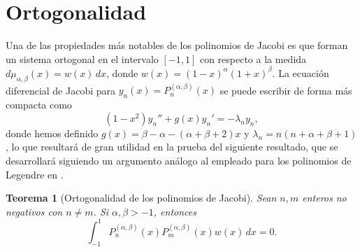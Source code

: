 \documentclass[12pt,a4paper]{book}
\newtheorem{theorem}{Teorema}
\begin{document}
\section{Ortogonalidad}

Una de las propiedades más notables de los polinomios de Jacobi es que forman un sistema ortogonal en el intervalo $[-1, 1]$ con respecto a la medida $d\mu_{\alpha, \beta}(x) = w(x) \, dx$, donde $w(x)=(1-x)^\alpha (1+x)^\beta$. La ecuación diferencial de Jacobi para $y_n(x) = P_n^{(\alpha, \beta)}(x)$ se puede escribir de forma más compacta como
\[
    (1-x^2)y_n'' + g(x)y_n' = -\lambda_n y_n,
\]
donde hemos definido $g(x) = \beta - \alpha - (\alpha + \beta + 2)x$ y $\lambda_n = n(n+\alpha+\beta+1)$, lo que resultará de gran utilidad en la prueba del siguiente resultado, que se desarrollará siguiendo un argumento análogo al empleado para los polinomios de Legendre en \cite{ciaurri}.

\begin{theorem}[Ortogonalidad de los polinomios de Jacobi]
Sean $n, m$ enteros no negativos con $n \neq m$. Si $\alpha, \beta > -1$, entonces
\[
 \int_{-1}^{1} P_n^{(\alpha, \beta)}(x) P_m^{(\alpha, \beta)}(x) w(x) \, dx = 0.
\]
\end{theorem}
\end{document}

